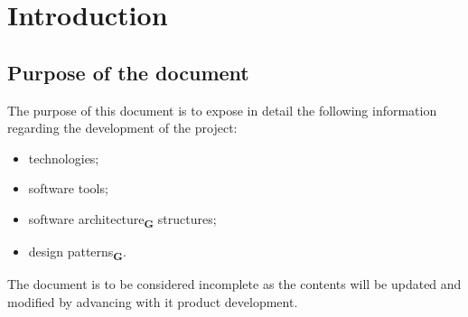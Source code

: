 \section{Introduction}
\subsection{Purpose of the document}
The purpose of this document is to expose in detail the following information regarding the development of the
project:
\begin{itemize}
    \item technologies;
    \item software tools;
    \item software architecture\textsubscript{\textbf{G}} structures;
    \item design patterns\textsubscript{\textbf{G}}.
\end{itemize}
The document is to be considered incomplete as the contents will be updated and modified by advancing with it
product development.
